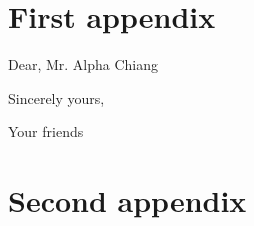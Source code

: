 \documentclass{mcmthesis}
\begin{document}
\begin{appendices}

\section{First appendix}


\begin{letter}{Dear, Mr. Alpha Chiang}

    \vspace{\parskip}

    Sincerely yours,

    Your friends

\end{letter}

\section{Second appendix}


\end{appendices}

\AImatter
\begin{ReportAiUse}{9}



\end{ReportAiUse}
\end{document}
